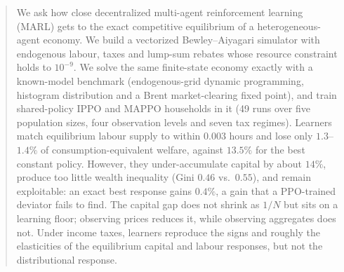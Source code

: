 \begin{abstract}
We ask how close decentralized multi-agent reinforcement learning (MARL) gets to the exact competitive equilibrium of
a heterogeneous-agent economy. We build a vectorized Bewley--Aiyagari simulator with endogenous labour, taxes and
lump-sum rebates whose resource constraint holds to $10^{-9}$. We solve the same finite-state economy exactly with a
known-model benchmark (endogenous-grid dynamic programming, histogram distribution and a Brent market-clearing fixed
point), and train shared-policy IPPO and MAPPO households in it (49 runs over five population sizes, four observation
levels and seven tax regimes). Learners match equilibrium labour supply to within $0.003$ hours and lose only
$1.3$--$1.4\%$ of consumption-equivalent welfare, against $13.5\%$ for the best constant policy. However, they
under-accumulate capital by about $14\%$, produce too little wealth inequality (Gini $0.46$ vs.\ $0.55$), and remain
exploitable: an exact best response gains $0.4\%$, a gain that a PPO-trained deviator fails to find. The capital gap
does not shrink as $1/N$ but sits on a learning floor; observing prices reduces it, while observing aggregates does
not. Under income taxes, learners reproduce the signs and roughly the elasticities of the equilibrium capital and labour
responses, but not the distributional response.
\end{abstract}
